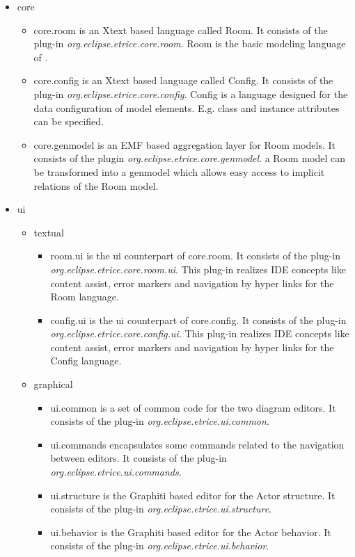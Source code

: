 \begin{itemize}
\item core

\begin{itemize}
\item core.room is an Xtext based language called Room. It consists of the plug-in 
\textit{org.eclipse.etrice.core.room}. Room is the basic modeling language of \eTrice{}.
\item core.config is an Xtext based language called Config. It consists of the plug-in 
\textit{org.eclipse.etrice.core.config}. Config is a language designed for the data configuration of model 
elements. E.g. class and instance attributes can be specified.
\item core.genmodel is an EMF based aggregation layer for Room models. It consists of the plugin 
\textit{org.eclipse.etrice.core.genmodel}. a Room model can be transformed into a genmodel which allows 
easy access to implicit relations of the Room model.
\end{itemize}

\item ui
\begin{itemize}
\item textual
\begin{itemize}

\item room.ui is the ui counterpart of core.room.  It consists of the plug-in 
\textit{org.eclipse.etrice.core.room.ui}. This plug-in realizes IDE concepts like content assist, error 
markers and navigation by hyper links for the Room language.
\item config.ui is the ui counterpart of core.config.  It consists of the plug-in 
\textit{org.eclipse.etrice.core.config.ui}. This plug-in realizes IDE concepts like content assist, error 
markers and navigation by hyper links for the Config language.
\end{itemize}

\item graphical
\begin{itemize}
\item ui.common is a set of common code for the two diagram editors. It consists of the plug-in 
\textit{org.eclipse.etrice.ui.common}.
\item ui.commands encapsulates some commands related to the navigation between \eTrice{} editors. It consists 
of the plug-in \textit{org.eclipse.etrice.ui.commands}.
\item ui.structure is the Graphiti based editor for the Actor structure. It consists of the plug-in 
\textit{org.eclipse.etrice.ui.structure}.
\item ui.behavior is the Graphiti based editor for the Actor behavior. It consists of the plug-in 
\textit{org.eclipse.etrice.ui.behavior}.
\end{itemize}
\end{itemize}


\end{itemize}

